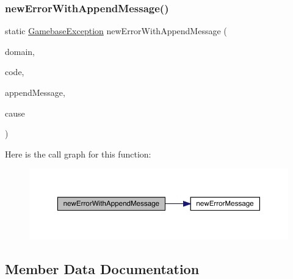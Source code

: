 \subsubsection{\texorpdfstring{new\+Error\+With\+Append\+Message()}{newErrorWithAppendMessage()}\hspace{0.1cm}{\footnotesize\ttfamily [2/2]}}
{\footnotesize\ttfamily static \hyperlink{classcom_1_1toast_1_1android_1_1gamebase_1_1base_1_1_gamebase_exception}{Gamebase\+Exception} new\+Error\+With\+Append\+Message (\begin{DoxyParamCaption}\item[{@Non\+Null final String}]{domain,  }\item[{final int}]{code,  }\item[{@Nullable String}]{append\+Message,  }\item[{@Nullable final Throwable}]{cause }\end{DoxyParamCaption})\hspace{0.3cm}{\ttfamily [static]}}

Here is the call graph for this function\+:
\nopagebreak
\begin{figure}[H]
\begin{center}
\leavevmode
\includegraphics[width=350pt]{classcom_1_1toast_1_1android_1_1gamebase_1_1base_1_1_gamebase_error_a6aa42722f0af25a63811f924fd940552_cgraph}
\end{center}
\end{figure}


\subsection{Member Data Documentation}
\mbox{\label{classcom_1_1toast_1_1android_1_1gamebase_1_1base_1_1_gamebase_error_ac04feb670905098cfe714fb8cc742453}} 
